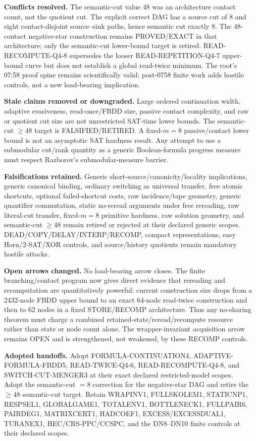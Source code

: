 \documentclass[11pt]{article}
\begin{document}
\textbf{Conflicts resolved.}
The semantic-cut value 48 was an architecture contact count, not the quotient cut. The explicit correct DAG has a source cut of 8 and eight contact-disjoint source--sink paths, hence semantic cut exactly 8. The 48-contact negative-star construction remains PROVED/EXACT in that architecture; only the semantic-cut lower-bound target is retired. READ-RECOMPUTE-Q4-8 supersedes the looser READ-REPETITION-Q4-7 upper-bound curve but does not establish a global read-twice minimum. The root's 07:58 proof spine remains scientifically valid; post-0758 finite work adds hostile controls, not a new load-bearing implication.

\textbf{Stale claims removed or downgraded.}
Large ordered continuation width, adaptive evasiveness, read-once/FBDD size, passive contact complexity, and raw or quotient cut size are not unrestricted SAT-time lower bounds. The semantic-cut \(\ge48\) target is FALSIFIED/RETIRED. A fixed-\(m=8\) passive/contact lower bound is not an asymptotic SAT hardness result. Any attempt to use a submodular cut/rank quantity as a generic Boolean-formula progress measure must respect Razborov's submodular-measure barrier.

\textbf{Falsifications retained.}
Generic short-source/canonicity/locality implications, generic canonical binding, ordinary switching as universal transfer, free atomic shortcuts, optional failed-shortcut costs, raw incidence/tape geometry, generic quantifier commutation, static no-reread arguments under free rereading, raw literal-cut transfer, fixed-\(m=8\) primitive hardness, raw solution geometry, and semantic-cut \(\ge48\) remain retired or rejected at their declared generic scopes. DEAD/COPY/DELAY/INTERP/RECOMP, compact representations, easy Horn/2-SAT/XOR controls, and source/history quotients remain mandatory hostile attacks.

\textbf{Open arrows changed.}
No load-bearing arrow closes. The finite branching/contact program now gives direct evidence that rereading and recomputation are quantitatively powerful: current construction size drops from a 2432-node FBDD upper bound to an exact 64-node read-twice construction and then to 62 nodes in a fixed STORE/RECOMP architecture. Thus any no-sharing theorem must charge a combined retained-state/reread/recompute resource rather than state or node count alone. The wrapper-invariant acquisition arrow remains OPEN and is strengthened, not weakened, by these RECOMP controls.

\textbf{Adopted handoffs.}
Adopt FORMULA-CONTINUATION4, ADAPTIVE-FORMULA-FBDD5, READ-TWICE-Q4-6, READ-RECOMPUTE-Q4-8, and SWITCH-CUT-MENGER3 at their exact declared restricted-model scopes. Adopt the semantic-cut \(=8\) correction for the negative-star DAG and retire the \(\ge48\) semantic-cut target. Retain WRAPINV1, FULLSKOLEM1, STATICNP1, RESPSEL1, GLOBALGAME1, TOTALENV1, BOTTLENECK1, FULLPAIR6, PAIRDEG1, MATRIXCERT1, HADCOEF1, EXCESS/EXCESSDUAL1, TURANEX1, HEC/CRS-PPC/CCSPC, and the DN8--DN10 finite controls at their declared scopes.
\end{document}
